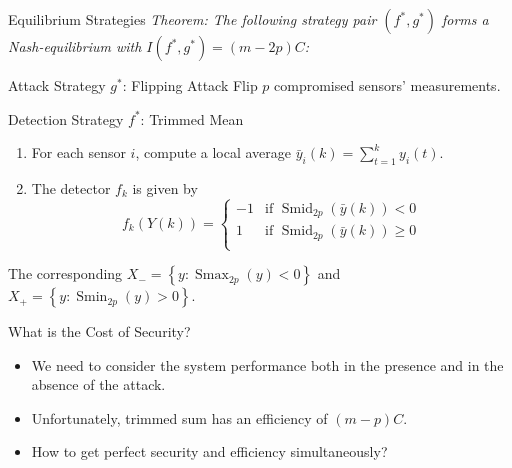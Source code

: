 \documentclass[10pt]{beamer}
\newcommand{\tikzdir}[1]{#1.tikz}
\newcommand{\inputtikz}[1]{}}
\DeclareMathOperator{\Smin}{Smin}
\DeclareMathOperator{\Smid}{Smid}
\DeclareMathOperator{\Smax}{Smax}
\begin{document}
\begin{frame}{Equilibrium Strategies}
  \it Theorem: The following strategy pair $(f^*,g^*)$ forms a Nash-equilibrium with $I(f^*,g^*) = (m-2p)C$:
  \begin{block}{Attack Strategy $g^*$: Flipping Attack}
    Flip $p$ compromised sensors' measurements.
  \end{block}
  \begin{block}{Detection Strategy $f^*$: Trimmed Mean}
    \begin{enumerate}
    \item For each sensor $i$, compute a local average $ \bar y_i(k) = \sum_{t=1}^k y_i(t)$.
    \item The detector $f_k$ is given by
      \begin{displaymath}
        f_k(Y(k)) = \begin{cases}
          -1 &\text{if }\Smid_{2p}(\bar y(k))< 0\\
          1 &\text{if }\Smid_{2p}(\bar y(k))\geq 0\\
        \end{cases}
      \end{displaymath}
    \end{enumerate}
  \end{block}
  The corresponding $X_- = \left\{y:\Smax_{2p}(y) < 0\right\}$ and $X_+ = \left\{y:\Smin_{2p}(y) > 0\right\}$.
\end{frame}

\begin{frame}{What is the Cost of Security?}
  \begin{itemize}
  \item We need to consider the system performance both in the presence and in the absence of the attack.
    \vspace{0.5cm}
    \begin{center}
      \inputtikz{fun_lim2}
    \end{center}
  \item Unfortunately, trimmed sum has an efficiency of $(m-p)C$.
  \item How to get perfect security and efficiency simultaneously?
  \end{itemize}
\end{frame}
\end{document}
